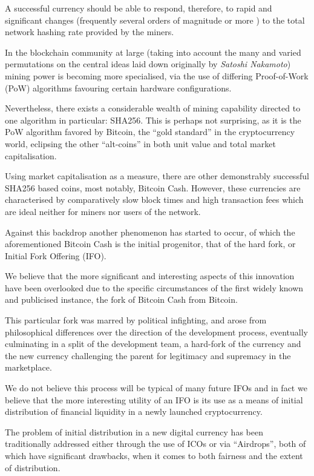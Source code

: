 \documentclass{IOS-Book-Article}
\begin{document}
A successful currency should be able to respond, therefore, to rapid and significant
changes (frequently several orders of magnitude or more \cite{r1}) to the total network hashing
rate provided by the miners.

In the blockchain community at large (taking into account the many and varied permutations
on the central ideas laid down originally by \textit{Satoshi Nakamoto}\cite{r2}) mining power is becoming
more specialised, via the use of differing Proof-of-Work (PoW) algorithms favouring certain hardware 
configurations.

Nevertheless, there exists a considerable wealth of mining capability directed to one 
algorithm in particular: SHA256. This is perhaps not surprising, as it is the PoW algorithm favored
by Bitcoin, the ``gold standard'' in the cryptocurrency world, eclipsing the other ``alt-coins''
in both unit value and total market capitalisation.

Using market capitalisation as a measure, there are other demonstrably successful SHA256 based coins,
most notably, Bitcoin Cash. However, these currencies are characterised by comparatively slow
block times and high transaction fees which are ideal neither for miners nor users of the network.

Against this backdrop another phenomenon has started to occur, of which the aforementioned Bitcoin Cash
is the initial progenitor, that of the hard fork, or Initial Fork Offering (IFO). 

We believe that the more significant and interesting aspects of this innovation have been overlooked due 
to the specific circumstances of the first widely known and publicised instance, the fork of Bitcoin 
Cash from Bitcoin. 

This particular fork was marred by political infighting, and arose from philosophical differences
over the direction of the development process, eventually culminating in a
split of the development team, a hard-fork of the currency and the new currency challenging the 
parent for legitimacy and supremacy in the marketplace.

We do not believe this process will be typical of many future IFOs and in fact we believe
that the more interesting utility of an IFO is its use as a means of initial distribution 
of financial liquidity in a newly launched cryptocurrency.

The problem of initial distribution in a new digital currency has been traditionally addressed either 
through the use of ICOs or via ``Airdrops'', both of which have significant drawbacks, when it comes
to both fairness and the extent of distribution.
\end{document}
